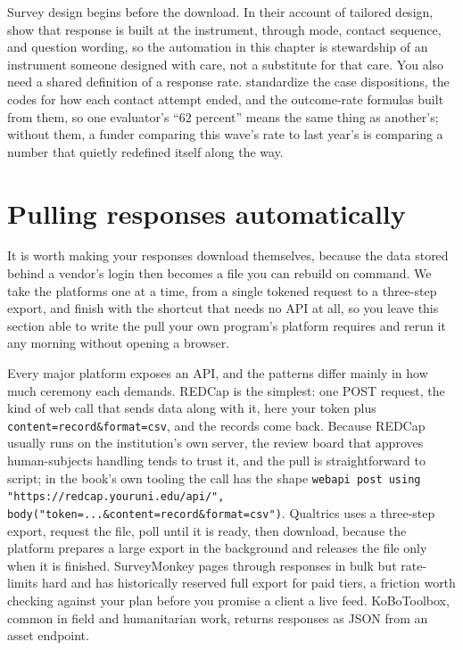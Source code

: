 Survey design begins before the download. In their account of tailored design, \textcite{dillman2014tailored} show that response is built at the instrument, through mode, contact sequence, and question wording, so the automation in this chapter is stewardship of an instrument someone designed with care, not a substitute for that care. You also need a shared definition of a response rate. \textcite{aapor2023standard} standardize the case dispositions, the codes for how each contact attempt ended, and the outcome-rate formulas built from them, so one evaluator's ``62 percent'' means the same thing as another's; without them, a funder comparing this wave's rate to last year's is comparing a number that quietly redefined itself along the way.

\section{Pulling responses automatically}
It is worth making your responses download themselves, because the data stored behind a vendor's login then becomes a file you can rebuild on command. We take the platforms one at a time, from a single tokened request to a three-step export, and finish with the shortcut that needs no API at all, so you leave this section able to write the pull your own program's platform requires and rerun it any morning without opening a browser.

Every major platform exposes an API, and the patterns differ mainly in how much ceremony each demands. REDCap is the simplest: one POST request, the kind of web call that sends data along with it, here your token plus \texttt{content=record\&format=csv}, and the records come back. Because REDCap usually runs on the institution's own server, the review board that approves human-subjects handling tends to trust it, and the pull is straightforward to script; in the book's own tooling the call has the shape \texttt{webapi post using "https://redcap.youruni.edu/api/", body("token=...\&content=record\&format=csv")}. Qualtrics uses a three-step export, request the file, poll until it is ready, then download, because the platform prepares a large export in the background and releases the file only when it is finished. SurveyMonkey pages through responses in bulk but rate-limits hard and has historically reserved full export for paid tiers, a friction worth checking against your plan before you promise a client a live feed. KoBoToolbox, common in field and humanitarian work, returns responses as JSON from an asset endpoint.

